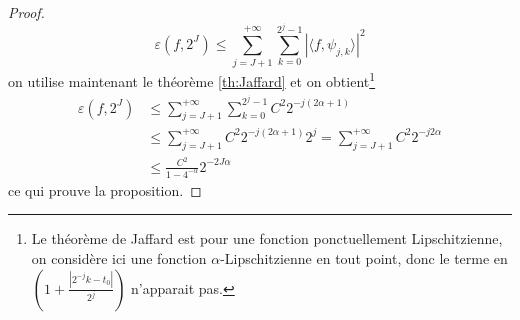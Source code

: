 \begin{proof}
	\begin{equation*}
		\varepsilon(f, 2^J) \leq \sum_{j=J+1}^{+\infty} \sum_{k=0}^{2^j -1} |\langle f, \psi_{j,k} \rangle|^2
	\end{equation*}
	on utilise maintenant le théorème \ref{th:Jaffard} et on obtient\footnote{Le théorème de Jaffard est pour une fonction ponctuellement Lipschitzienne, on considère ici une fonction $\alpha$-Lipschitzienne en tout point, donc le terme en $(1 + \frac{|2^{-j}k -t_0|}{2^j})$ n'apparait pas.}
	\begin{align*}
		\varepsilon(f, 2^J) &\leq \sum_{j=J+1}^{+\infty} \sum_{k=0}^{2^j -1} C^2 2^{-j(2\alpha + 1)} \\
		&\leq \sum_{j=J+1}^{+\infty} C^2 2^{-j(2\alpha + 1)} 2^{j} = \sum_{j=J+1}^{+\infty} C^2 2^{-j2\alpha} \\
		&\leq \frac{C^2}{1 - 4^{-\alpha}} 2^{-2J\alpha}	
	\end{align*}
	ce qui prouve la proposition.
\end{proof}

